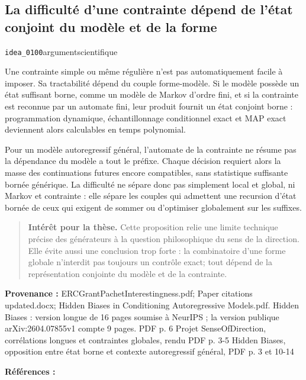 \documentclass[10pt,a4paper]{article}
\begin{document}
\subsection{La difficulté d'une contrainte dépend de l'état conjoint du modèle et de la forme}
{\small\color{metadata} \texttt{idea\_0100}\quad\textbullet\quad argument\quad\textbullet\quad scientifique\par}

Une contrainte simple ou même régulière n'est pas automatiquement facile à imposer. Sa tractabilité dépend du couple forme-modèle. Si le modèle possède un état suffisant borne, comme un modèle de Markov d'ordre fini, et si la contrainte est reconnue par un automate fini, leur produit fournit un état conjoint borne : programmation dynamique, échantillonnage conditionnel exact et MAP exact deviennent alors calculables en temps polynomial.

Pour un modèle autoregressif général, l'automate de la contrainte ne résume pas la dépendance du modèle a tout le préfixe. Chaque décision requiert alors la masse des continuations futures encore compatibles, sans statistique suffisante bornée générique. La difficulté ne sépare donc pas simplement local et global, ni Markov et contrainte : elle sépare les couples qui admettent une recursion d'état bornée de ceux qui exigent de sommer ou d'optimiser globalement sur les suffixes.

\begin{quote}
\textbf{Intérêt pour la thèse.} Cette proposition relie une limite technique précise des générateurs à la question philosophique du sens de la direction. Elle évite aussi une conclusion trop forte : la combinatoire d'une forme globale n'interdit pas toujours un contrôle exact; tout dépend de la représentation conjointe du modèle et de la contrainte.
\end{quote}
{\footnotesize\color{metadata}\textbf{Provenance :} ERCGrantPachetInterestingness.pdf; Paper citations updated.docx; Hidden Biases in Conditioning Autoregressive Models.pdf. Hidden Biases : version longue de 16 pages soumise à NeurIPS ; la version publique arXiv:2604.07855v1 compte 9 pages. PDF p. 6 Projet SenseOfDirection, corrélations longues et contraintes globales, rendu PDF p. 3-5 Hidden Biases, opposition entre état borne et contexte autoregressif général, PDF p. 3 et 10-14\par}
{\footnotesize\color{metadata}\textbf{Références :} \parencite{pachet2026biases}\par}
\end{document}
